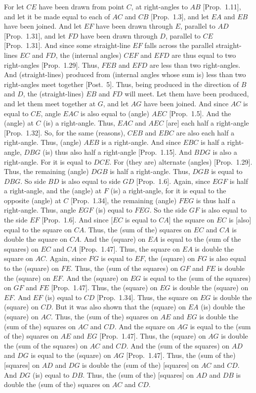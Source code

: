 For let $CE$ have been drawn from point $C$, at right-angles to $AB$ [Prop.~1.11],
and let it be made equal to each of $AC$ and $CB$ [Prop.~1.3], and let $EA$ and
$EB$ have been joined. And let $EF$ have been drawn through $E$, parallel to $AD$
[Prop.~1.31], and let $FD$ have been drawn through $D$, parallel to $CE$ [Prop.~1.31]. And since some straight-line $EF$ falls across the parallel straight-lines $EC$ and $FD$, the (internal angles) $CEF$ and $EFD$ are thus equal
to two right-angles [Prop.~1.29]. Thus, $FEB$ and $EFD$ are less than two
right-angles. And (straight-lines) produced from (internal angles whose sum is) less than
two right-angles meet together [Post.~5]. Thus, being produced in the direction of $B$
and $D$, the (straight-lines) $EB$ and $FD$ will meet. Let them have been 
produced,
and let them meet together at $G$, and let $AG$ have been joined.
And since $AC$ is equal to $CE$, angle $EAC$ is also equal to (angle) $AEC$ [Prop.~1.5]. And the (angle) at $C$ (is) a right-angle. Thus, $EAC$ and $AEC$
[are] each half a right-angle [Prop.~1.32]. So, for the same (reasons), $CEB$ and $EBC$ are
also each half a right-angle. Thus, (angle) $AEB$ is a right-angle.
And since $EBC$ is half a right-angle, $DBG$ (is) thus also half a right-angle
[Prop.~1.15]. And $BDG$ is also a right-angle. For it is equal to $DCE$.
For (they are) alternate (angles) [Prop.~1.29].
Thus, the remaining (angle) $DGB$ is half a right-angle. Thus,
$DGB$ is equal to $DBG$. So side $BD$ is also equal to side $GD$ [Prop.~1.6].
Again, 
since $EGF$ is  half a right-angle, and the (angle) at $F$ (is) a right-angle,
for it is equal to the opposite (angle) at $C$
[Prop.~1.34], the remaining
(angle) $FEG$ is thus half a right-angle. Thus, angle $EGF$ (is) equal to $FEG$.
So the side $GF$ is also equal to the side $EF$ [Prop.~1.6].
And since [$EC$ is equal to $CA$] the square on $EC$ is [also] equal to the
square on $CA$. Thus, the (sum of the) squares on $EC$ and $CA$ is 
double the square on $CA$. And the (square) on $EA$ is equal to the (sum of the
squares) on $EC$ and $CA$ [Prop.~1.47]. Thus, the square on $EA$ is double the
square on $AC$. Again, since $FG$ is equal to $EF$, the (square) on $FG$ is also
equal to the (square) on $FE$. Thus, the (sum of the squares) on $GF$ and
$FE$ is double the (square) on $EF$. And the (square) on $EG$ is equal to
the (sum of the squares) on  $GF$ and $FE$ [Prop.~1.47]. Thus, the (square)
on $EG$ is double the (square) on $EF$. And $EF$ (is) equal to $CD$  [Prop.~1.34].
Thus, the square on $EG$ is double the (square) on $CD$. But it was also
shown that the (square) on $EA$ (is) double the (square) on $AC$. Thus,
the (sum of the) squares on $AE$ and $EG$ is double the (sum of the) squares
on $AC$ and $CD$. And the square on $AG$ is equal to the (sum of the) squares
on $AE$ and $EG$ [Prop.~1.47]. Thus, the (square) on $AG$ is double the (sum of the squares) on $AC$ and $CD$. And the (sum of the squares) on $AD$ and $DG$ 
is equal to the (square) on $AG$  [Prop.~1.47].
Thus, the (sum of the) [squares] on $AD$ and $DG$ is double the
(sum of the) [squares] on $AC$ and $CD$. And $DG$ (is) equal to $DB$.
Thus, the (sum of the) [squares] on $AD$ and $DB$ is double the
(sum of the) squares on $AC$ and $CD$. 

